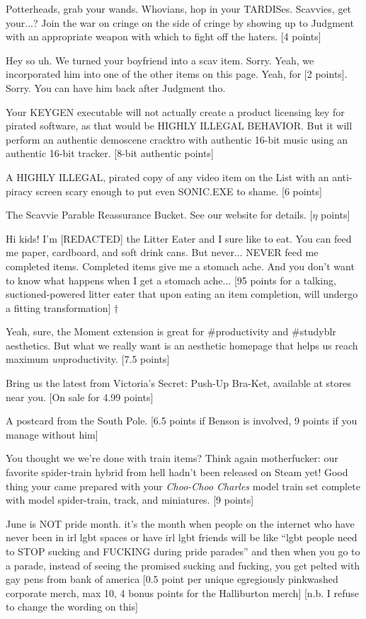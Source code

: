 \documentclass{book}
\begin{document}
\begin{list}{}{}
\item Potterheads, grab your wands. Whovians, hop in your TARDISes. Scavvies, get your...? Join the war on cringe on the side of cringe by showing up to Judgment with an appropriate weapon with which to fight off the haters. [4 points]
\item Hey so uh. We turned your boyfriend into a scav item. Sorry. Yeah, we incorporated him into one of the other items on this page. Yeah, for [2 points]. Sorry. You can have him back after Judgment tho.
\item Your KEYGEN executable will not actually create a product licensing key for pirated software, as that would be HIGHLY ILLEGAL BEHAVIOR. But it will perform an authentic demoscene cracktro with authentic 16-bit music using an authentic 16-bit tracker. [8-bit authentic points] \textleaf
\newpage
\item A HIGHLY ILLEGAL, pirated copy of any video item on the List with an anti-piracy screen scary enough to put even SONIC.EXE to shame. [6 points]
\item The Scavvie Parable Reassurance Bucket. See our website for details. [$\eta$ points]
\item Hi kids! I'm [REDACTED] the Litter Eater and I sure like to eat. You can feed me paper, cardboard, and soft drink cans. But never... NEVER feed me completed items. Completed items give me a stomach ache. And you don't want to know what happens when I get a stomach ache... [95 points for a talking, suctioned-powered litter eater that upon eating an item completion, will undergo a fitting transformation] $\dagger$
\item Yeah, sure, the Moment extension is great for \#productivity and \#studyblr aesthetics. But what we really want is an aesthetic homepage that helps us reach maximum \textit{un}productivity. [7.5 points]
\item Bring us the latest from Victoria’s Secret: Push-Up Bra-Ket, available at stores near you. [On sale for 4.99 points]
\item A postcard from the South Pole. [6.5 points if Benson is involved, 9 points if you manage without him]
\item You thought we we're done with train items? Think again motherfucker: our favorite spider-train hybrid from hell hadn’t been released on Steam yet! Good thing your came prepared with your \textit{Choo-Choo Charles} model train set complete with model spider-train, track, and miniatures. [9 points]
\item June is NOT pride month. it’s the month when people on the internet who have never been in irl lgbt spaces or have irl lgbt friends will be like “lgbt people need to STOP sucking and FUCKING during pride parades” and then when you go to a parade, instead of seeing the promised sucking and fucking, you get pelted with gay pens from bank of america [0.5 point per unique egregiously pinkwashed corporate merch, max 10, 4 bonus points for the Halliburton merch] [n.b. I refuse to change the wording on this]

\end{list}
\end{document}
